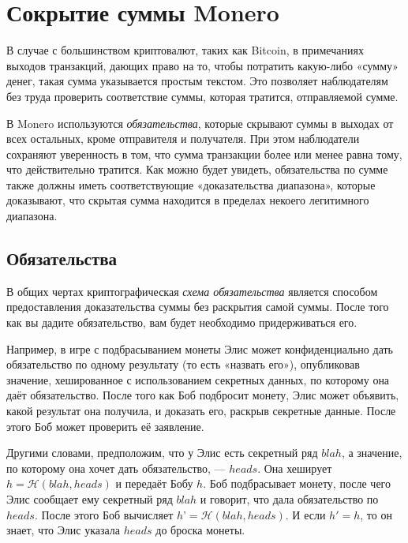 \chapter{Сокрытие суммы Monero}
\label{chapter:pedersen-commitments}

В случае с большинством криптовалют, таких как Bitcoin, в примечаниях выходов транзак\-ций, дающих право на то, чтобы потратить какую-либо «сумму» денег, такая сумма указыва\-ется простым текстом. Это позволяет наблюдателям без труда проверить соответствие суммы, которая тратится, отправляемой сумме.

В Monero используются {\em обязательства}, которые скрывают суммы в выходах от всех осталь\-ных, кроме отправителя и получателя. При этом наблюдатели сохраняют уверенность в том, что сумма транзакции более или менее равна тому, что действительно тратится. Как можно будет увидеть, обязательства по сумме также должны иметь соответствующие «доказатель\-ства диапазона», которые доказывают, что скрытая сумма находится в пределах некоего легитимного диапазона.



\section{Обязательства}
\label{sec:commitments}

В общих чертах криптографическая {\em схема обязательства} является способом предоставления доказательства суммы без раскрытия самой суммы. После того как вы дадите обязательство, вам будет необходимо придерживаться его.

Например, в игре с подбрасыванием монеты Элис может конфиденциально дать обязательство по одному результату (то есть «назвать его»), опубликовав значение, хешированное с использо\-ванием секретных данных, по которому она даёт обязательство. После того как Боб подбросит монету, Элис может объявить, какой результат она получила, и доказать его, раскрыв секрет\-ные данные. После этого Боб может проверить её заявление.

Другими словами, предположим, что у Элис есть секретный ряд $blah$, а значение, по которому она хочет дать обязательство, — $heads$. Она хеширует $h = \mathcal{H}(blah, heads)$ и передаёт Бобу $h$. Боб подбрасывает монету, после чего Элис сообщает ему секретный ряд $blah$ и говорит, что дала обязательство по $heads$. После этого Боб вычисляет $h’ = \mathcal{H}(blah, heads)$. И если $h' = h$, то он знает, что Элис указала $heads$ до броска монеты.

